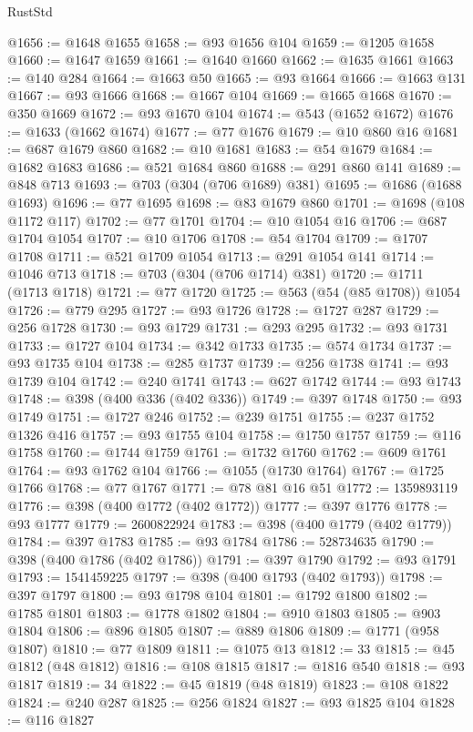 \begin{lexlean}{RustStd}
\begin{coremodule}
@1656 := @1648 @1655
@1658 := @93 @1656 @104
@1659 := @1205 @1658
@1660 := @1647 @1659
@1661 := @1640 @1660
@1662 := @1635 @1661
@1663 := @140 @284
@1664 := @1663 @50
@1665 := @93 @1664
@1666 := @1663 @131
@1667 := @93 @1666
@1668 := @1667 @104
@1669 := @1665 @1668
@1670 := @350 @1669
@1672 := @93 @1670 @104
@1674 := @543 (@1652 @1672)
@1676 := @1633 (@1662 @1674)
@1677 := @77 @1676
@1679 := @10 @860 @16
@1681 := @687 @1679 @860
@1682 := @10 @1681
@1683 := @54 @1679
@1684 := @1682 @1683
@1686 := @521 @1684 @860
@1688 := @291 @860 @141
@1689 := @848 @713
@1693 := @703 (@304 (@706 @1689) @381)
@1695 := @1686 (@1688 @1693)
@1696 := @77 @1695
@1698 := @83 @1679 @860
@1701 := @1698 (@108 @1172 @117)
@1702 := @77 @1701
@1704 := @10 @1054 @16
@1706 := @687 @1704 @1054
@1707 := @10 @1706
@1708 := @54 @1704
@1709 := @1707 @1708
@1711 := @521 @1709 @1054
@1713 := @291 @1054 @141
@1714 := @1046 @713
@1718 := @703 (@304 (@706 @1714) @381)
@1720 := @1711 (@1713 @1718)
@1721 := @77 @1720
@1725 := @563 (@54 (@85 @1708)) @1054
@1726 := @779 @295
@1727 := @93 @1726
@1728 := @1727 @287
@1729 := @256 @1728
@1730 := @93 @1729
@1731 := @293 @295
@1732 := @93 @1731
@1733 := @1727 @104
@1734 := @342 @1733
@1735 := @574 @1734
@1737 := @93 @1735 @104
@1738 := @285 @1737
@1739 := @256 @1738
@1741 := @93 @1739 @104
@1742 := @240 @1741
@1743 := @627 @1742
@1744 := @93 @1743
@1748 := @398 (@400 @336 (@402 @336))
@1749 := @397 @1748
@1750 := @93 @1749
@1751 := @1727 @246
@1752 := @239 @1751
@1755 := @237 @1752 @1326 @416
@1757 := @93 @1755 @104
@1758 := @1750 @1757
@1759 := @116 @1758
@1760 := @1744 @1759
@1761 := @1732 @1760
@1762 := @609 @1761
@1764 := @93 @1762 @104
@1766 := @1055 (@1730 @1764)
@1767 := @1725 @1766
@1768 := @77 @1767
@1771 := @78 @81 @16 @51
@1772 := 1359893119
@1776 := @398 (@400 @1772 (@402 @1772))
@1777 := @397 @1776
@1778 := @93 @1777
@1779 := 2600822924
@1783 := @398 (@400 @1779 (@402 @1779))
@1784 := @397 @1783
@1785 := @93 @1784
@1786 := 528734635
@1790 := @398 (@400 @1786 (@402 @1786))
@1791 := @397 @1790
@1792 := @93 @1791
@1793 := 1541459225
@1797 := @398 (@400 @1793 (@402 @1793))
@1798 := @397 @1797
@1800 := @93 @1798 @104
@1801 := @1792 @1800
@1802 := @1785 @1801
@1803 := @1778 @1802
@1804 := @910 @1803
@1805 := @903 @1804
@1806 := @896 @1805
@1807 := @889 @1806
@1809 := @1771 (@958 @1807)
@1810 := @77 @1809
@1811 := @1075 @13
@1812 := 33
@1815 := @45 @1812 (@48 @1812)
@1816 := @108 @1815
@1817 := @1816 @540
@1818 := @93 @1817
@1819 := 34
@1822 := @45 @1819 (@48 @1819)
@1823 := @108 @1822
@1824 := @240 @287
@1825 := @256 @1824
@1827 := @93 @1825 @104
@1828 := @116 @1827

\end{coremodule}
\end{lexlean}
